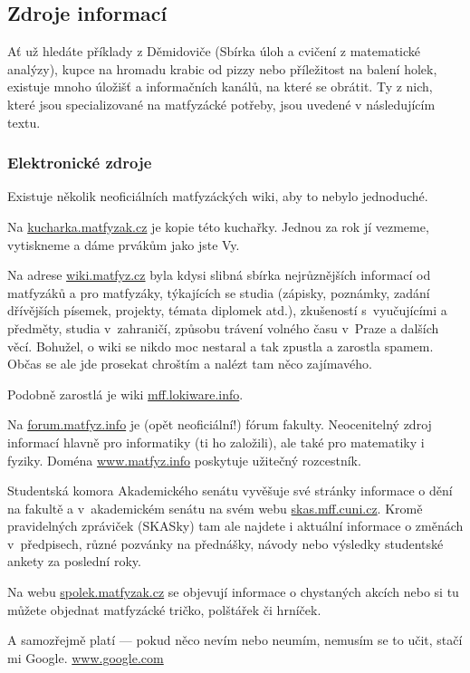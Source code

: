 \subsection{Zdroje informací}
Ať už hledáte příklady z Děmidoviče (Sbírka úloh a cvičení z matematické analýzy), kupce na hromadu krabic od pizzy nebo příležitost na balení holek, existuje mnoho úložišť a informačních kanálů, na které se obrátit. Ty z nich, které jsou specializované na matfyzácké potřeby, jsou uvedené v následujícím textu.

\subsubsection{Elektronické zdroje}
Existuje několik neoficiálních matfyzáckých wiki, aby to nebylo jednoduché.

Na \url{kucharka.matfyzak.cz} je kopie této kuchařky. Jednou za rok jí vezmeme, vytiskneme a dáme prvákům jako jste Vy.

Na adrese \url{wiki.matfyz.cz} byla kdysi slibná sbírka nejrůznějších informací od matfyzáků a pro matfyzáky, týkajících se studia (zápisky, poznámky, zadání dřívějších písemek, projekty, témata diplomek atd.), zkušeností s~vyučujícími a předměty, studia v~zahraničí, způsobu trávení volného času v~Praze a dalších věcí. Bohužel, o wiki se nikdo moc nestaral a tak zpustla a zarostla spamem. Občas se ale jde prosekat chroštím a nalézt tam něco zajímavého.

Podobně zarostlá je wiki \url{mff.lokiware.info}.

Na \url{forum.matfyz.info} je (opět neoficiální!) fórum fakulty. Neocenitelný zdroj informací hlavně pro informatiky (ti ho založili), ale také pro matematiky i fyziky. Doména \url{www.matfyz.info} poskytuje užitečný rozcestník.

Studentská komora Akademického senátu vyvěšuje své stránky informace o dění na fakultě a v~akademickém senátu na svém webu \url{skas.mff.cuni.cz}. Kromě pravidelných zpráviček (SKASky) tam ale najdete i aktuální informace o změnách v~předpisech, různé pozvánky na přednášky, návody nebo výsledky studentské ankety za poslední roky.

Na webu \url{spolek.matfyzak.cz} se objevují informace o chystaných
akcích nebo si tu můžete objednat matfyzácké tričko, polštářek či
hrníček.

A samozřejmě platí --- pokud něco nevím nebo neumím, nemusím se to učit, stačí mi Google. \url{www.google.com}

